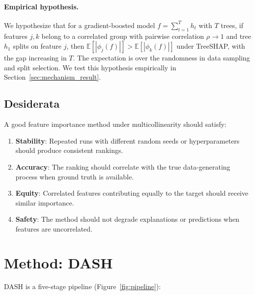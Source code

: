 \documentclass[11pt]{article}
\newcommand{\dash}{\textsc{DASH}}
\newcommand{\rhovar}{\rho}
\begin{document}
\paragraph{Empirical hypothesis.}
We hypothesize that for a gradient-boosted model $f = \sum_{t=1}^{T} h_t$
with $T$ trees, if features $j, k$ belong to a correlated group with
pairwise correlation $\rhovar \to 1$ and tree $h_1$ splits on feature
$j$, then $\mathbb{E}[|\phi_j(f)|] > \mathbb{E}[|\phi_k(f)|]$ under
TreeSHAP, with the gap increasing in $T$. The expectation is over the
randomness in data sampling and split selection. We test this hypothesis
empirically in Section~\ref{sec:mechanism_result}.

\subsection{Desiderata}

A good feature importance method under multicollinearity should satisfy:
\begin{enumerate}
  \item \textbf{Stability}: Repeated runs with different random seeds or
    hyperparameters should produce consistent rankings.
  \item \textbf{Accuracy}: The ranking should correlate with the true
    data-generating process when ground truth is available.
  \item \textbf{Equity}: Correlated features contributing equally to the
    target should receive similar importance.
  \item \textbf{Safety}: The method should not degrade explanations or
    predictions when features are uncorrelated.
\end{enumerate}


\section{Method: DASH}
\label{sec:method}

\dash{} is a five-stage pipeline (Figure~\ref{fig:pipeline}):
\end{document}
